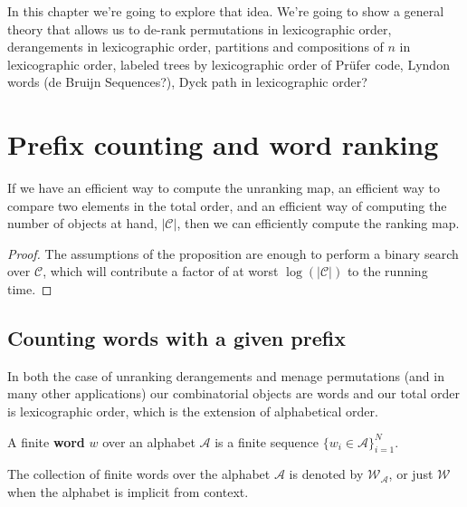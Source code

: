 
In this chapter we're going to explore that idea. We're going to show a general
theory that allows us to de-rank
permutations in lexicographic order,
derangements in lexicographic order,
partitions and compositions of $n$ in lexicographic order,
labeled trees by lexicographic order of Pr\"ufer code,
Lyndon words \cite{Kociumaka2014} (de Bruijn Sequences?),
Dyck path in lexicographic order?
\section{Prefix counting and word ranking}


\begin{proposition}
  If we have
  an efficient way to compute the unranking map,
  an efficient way to compare two elements in the total order,
  and an efficient way of computing the number of objects at hand, $|\mathcal C|$,
  then we can efficiently compute the ranking map.
  \label{prop:unrankToRank}
\end{proposition}
\begin{proof}
  The assumptions of the proposition are enough to perform a binary search
  over $\mathcal C$, which will contribute a factor of at worst
  $\log(|\mathcal C|)$ to the running time.
\end{proof}

\subsection{Counting words with a given prefix}
In both the case of unranking derangements and menage permutations
(and in many other applications) our combinatorial objects are
words and our total order is lexicographic order, which is the extension of
alphabetical order.

\begin{definition}
  A finite \textbf{word} $w$ over an alphabet $\mathcal A$ is a finite sequence
  $\{w_i \in \mathcal A\}_{i=1}^N$.

  The collection of finite words over the alphabet $\mathcal A$ is denoted by
  $\mathcal{W}_\mathcal{A}$, or just $\mathcal{W}$ when the alphabet is
  implicit from context.
\end{definition}

